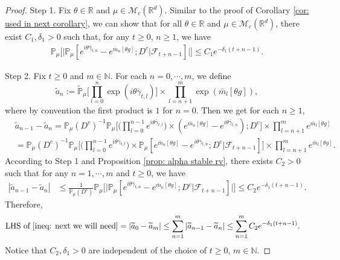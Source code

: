 \documentclass[12pt,a4paper]{amsart}
\theoremstyle{plain}
\theoremstyle{definition}
\numberwithin{equation}{section}
\begin{document}
\begin{proof}
  Step 1. Fix $\theta \in \mathbb R$ and $\mu \in \mathcal M_c(\mathbb R^d)$.
  Similar to the proof of Corollary \ref{cor: used in next corollary}, we can show that  for all $\theta\in \mathbb{R}$ and $\mu\in \mathcal{M}_c(\mathbb{R}^d)$, there exist $C_1,\delta_1>0$ such that, for any $t\geq 0$, $n\geq 1$, we have
  \begin{align}
    \mathbb{P}_{\mu}\Big[\big|\mathbb{P}_{\mu}[e^{i\theta\bar{\gamma}_{t,n}}-e^{\bar{m}_n[\theta g]}; D^c | \mathscr F_{t+n-1}]\big|\Big]\leq C_1e^{-\delta_1(t+n-1)}.
  \end{align}

  Step 2.
  Fix $t\geq 0$ and $m\in \mathbb{N}$.
  For each $n=0,\cdots,m$, we define
  \[
    \widetilde{a}_n
    := \mathbb{\widetilde{P}}_{\mu}\Big[\prod_{l=0}^{n}\exp(i\theta\bar{\gamma}_{t,l})\Big] \times \prod_{l=n+1}^{m}\exp(\bar{m}_l[\theta g]),
  \]
  where by convention the first product is $1$ for $n=0$. Then we get for each $n \ge 1$,
  \begin{align}
    & \widetilde{a}_{n-1} - \widetilde{a}_n
     = \mathbb{P}_{ \mu } ( D^c )^{ - 1 } \mathbb{P}_{ \mu } \Big[ \Big( \prod_{ l=0 }^{n - 1 } e^{ i \theta \bar{ \gamma }_{ t, l} } \Big) \times ( e^{ \bar{m}_n [ \theta g ] } - e^{ i \theta \bar{ \gamma }_{t, n}}) ; D^c \Big] \times \prod_{ l = n + 1}^{ m } e^{\bar{ m }_l[ \theta g ] } \\ 
    & = \mathbb{ P }_{ \mu }( D^c )^{ - 1 } \mathbb{P}_{ \mu } \Big[ \Big( \prod_{ l = 0 }^{n - 1} e^{ i \theta \bar{ \gamma }_{t, l} } \Big) \times \mathbb{P}_{\mu}[e^{\bar{m}_n[\theta g]}-e^{i\theta \bar{\gamma}_{t,n}};D^c|\mathscr{F}_{t+n-1}]\Big]\times \prod_{l=n+1}^{m}e^{\bar{m}_l[\theta g]}.
  \end{align}
  According to Step 1 and Proposition \ref{prop: alpha stable rv}, there exists $C_2>0$ such that for any $n=1,\cdots, m$ and $t\geq 0$, we have
  \begin{align}
    | \widetilde{a}_{n-1}- \widetilde{a}_n|
    & \leq \frac{1}{\mathbb{P}_{\mu}(D^c)}\mathbb{P}_{\mu}\Big[\big|\mathbb P_\mu[e^{i\theta\bar{\gamma}_{t,n}}-e^{\bar{m}_n[\theta g]}; D^c\big|\mathscr{F}_{t+n-1}]\big|\Big]
    \leq C_2 e^{-\delta_1(t+n-1)}.
  \end{align}
  Therefore,
  \begin{align}
    \text{LHS of \eqref{ineq: next we will need}}
    & = \left|\widetilde{a}_{0}-\widetilde{a}_m\right|
      \leq\sum_{n=1}^m\left|\widetilde{a}_{n-1}-\widetilde{a}_n\right|
      \leq \sum_{n=1}^m C_2 e^{-\delta_1(t+n-1)}.
  \end{align}
	Notice that $C_2, \delta_1>0$ are independent of the choice of $t\geq 0$, $m\in \mathbb{N}$.
\end{proof}
\end{document}
